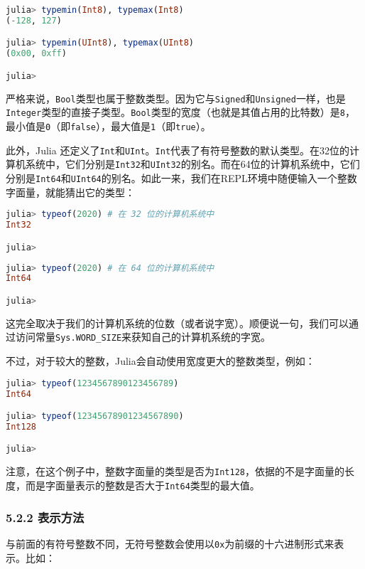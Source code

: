\begin{lstlisting}[language=julia]
julia> typemin(Int8), typemax(Int8)
(-128, 127)

julia> typemin(UInt8), typemax(UInt8)
(0x00, 0xff)

julia> 
\end{lstlisting}

严格来说，\verb|Bool|类型也属于整数类型。因为它与\verb|Signed|和\verb|Unsigned|一样，也是\verb|Integer|类型的直接子类型。\verb|Bool|类型的宽度（也就是其值占用的比特数）是\verb|8|，最小值是\verb|0|（即\verb|false|），最大值是\verb|1|（即\verb|true|）。

此外，Julia 还定义了\verb|Int|和\verb|UInt|。\verb|Int|代表了有符号整数的默认类型。在32位的计算机系统中，它们分别是\verb|Int32|和\verb|UInt32|的别名。而在64位的计算机系统中，它们分别是\verb|Int64|和\verb|UInt64|的别名。如此一来，我们在REPL环境中随便输入一个整数字面量，就能猜出它的类型：

\begin{lstlisting}[language=julia]
julia> typeof(2020) # 在 32 位的计算机系统中 
Int32 

julia> 
\end{lstlisting}

\begin{lstlisting}[language=julia]
julia> typeof(2020) # 在 64 位的计算机系统中 
Int64

julia> 
\end{lstlisting}

这完全取决于我们的计算机系统的位数（或者说字宽）。顺便说一句，我们可以通过访问常量\verb|Sys.WORD_SIZE|来获知自己的计算机系统的字宽。

不过，对于较大的整数，Julia会自动使用宽度更大的整数类型，例如：

\begin{lstlisting}[language=julia]
julia> typeof(1234567890123456789)
Int64

julia> typeof(12345678901234567890)
Int128

julia> 
\end{lstlisting}

注意，在这个例子中，整数字面量的类型是否为\verb|Int128|，依据的不是字面量的长度，而是字面量表示的整数是否大于\verb|Int64|类型的最大值。

\subsubsection{5.2.2 表示方法}

与前面的有符号整数不同，无符号整数会使用以\verb|0x|为前缀的十六进制形式来表示。比如：

